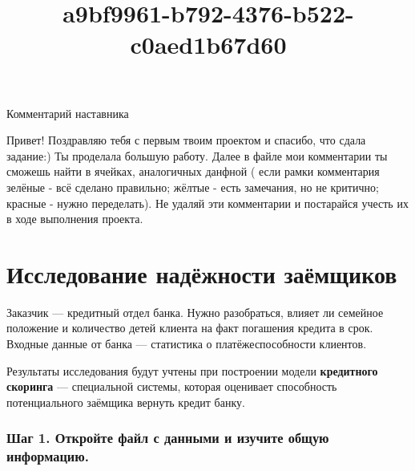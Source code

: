 \documentclass[11pt]{article}
\title{a9bf9961-b792-4376-b522-c0aed1b67d60}
\begin{document}
    
    
    \maketitle
    
    

    
    Комментарий наставника

Привет! Поздравляю тебя с первым твоим проектом и спасибо, что сдала
задание:) Ты проделала большую работу. Далее в файле мои комментарии ты
сможешь найти в ячейках, аналогичных данфной ( если рамки комментария
зелёные - всё сделано правильно; жёлтые - есть замечания, но не
критично; красные - нужно переделать). Не удаляй эти комментарии и
постарайся учесть их в ходе выполнения проекта.

    \hypertarget{ux438ux441ux441ux43bux435ux434ux43eux432ux430ux43dux438ux435-ux43dux430ux434ux451ux436ux43dux43eux441ux442ux438-ux437ux430ux451ux43cux449ux438ux43aux43eux432}{%
\section{Исследование надёжности
заёмщиков}\label{ux438ux441ux441ux43bux435ux434ux43eux432ux430ux43dux438ux435-ux43dux430ux434ux451ux436ux43dux43eux441ux442ux438-ux437ux430ux451ux43cux449ux438ux43aux43eux432}}

Заказчик --- кредитный отдел банка. Нужно разобраться, влияет ли
семейное положение и количество детей клиента на факт погашения кредита
в срок. Входные данные от банка --- статистика о платёжеспособности
клиентов.

Результаты исследования будут учтены при построении модели
\textbf{кредитного скоринга} --- специальной системы, которая оценивает
способность потенциального заёмщика вернуть кредит банку.

    \hypertarget{ux448ux430ux433-1.-ux43eux442ux43aux440ux43eux439ux442ux435-ux444ux430ux439ux43b-ux441-ux434ux430ux43dux43dux44bux43cux438-ux438-ux438ux437ux443ux447ux438ux442ux435-ux43eux431ux449ux443ux44e-ux438ux43dux444ux43eux440ux43cux430ux446ux438ux44e.}{%
\subsubsection{Шаг 1. Откройте файл с данными и изучите общую
информацию.}\label{ux448ux430ux433-1.-ux43eux442ux43aux440ux43eux439ux442ux435-ux444ux430ux439ux43b-ux441-ux434ux430ux43dux43dux44bux43cux438-ux438-ux438ux437ux443ux447ux438ux442ux435-ux43eux431ux449ux443ux44e-ux438ux43dux444ux43eux440ux43cux430ux446ux438ux44e.}}
\end{document}
